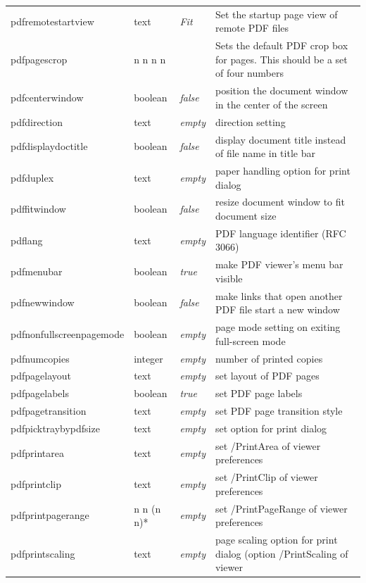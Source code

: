 \documentclass[pdftex]{article}
\begin{document}
\begin{longtable}{@{}>{\ttfamily}l>{\raggedright}p{}>{\itshape}lp{7cm}@{}}
pdfremotestartview & text    & Fit   & Set the startup page view of remote PDF files \\
pdfpagescrop       & n n n n &       & Sets the default PDF crop box for pages. This should be a set of four numbers \\
pdfcenterwindow    & boolean & false & position the document window in the center of the screen \\
pdfdirection       & text    & empty & direction setting \\
pdfdisplaydoctitle & boolean & false & display document title instead of
                                       file name in title bar\\
pdfduplex          & text    & empty & paper handling option for print dialog\\
pdffitwindow       & boolean & false & resize document window to fit document size \\
pdflang            & text    & empty & PDF language identifier (RFC 3066)\\
pdfmenubar         & boolean & true  & make PDF viewer's menu bar visible \\
pdfnewwindow       & boolean & false & make links that open another PDF file start a new window \\
pdfnonfullscreenpagemode
                   & boolean & empty & page mode setting on exiting
                                       full-screen mode\\
pdfnumcopies       & integer & empty & number of printed copies \\
pdfpagelayout      & text    & empty & set layout of PDF pages \\
pdfpagelabels      & boolean & true  & set PDF page labels \\
pdfpagetransition  & text    & empty & set PDF page transition style \\
pdfpicktraybypdfsize & text & empty & set option for print dialog \\
pdfprintarea       & text    & empty & set /PrintArea of viewer preferences \\
pdfprintclip       & text    & empty & set /PrintClip of viewer preferences \\
pdfprintpagerange  & n n (n n)*
                             & empty & set /PrintPageRange of viewer
                                       preferences\\
pdfprintscaling    & text    & empty & page scaling option for print dialog
                                       (option /PrintScaling of viewer

\end{longtable}
\end{document}
